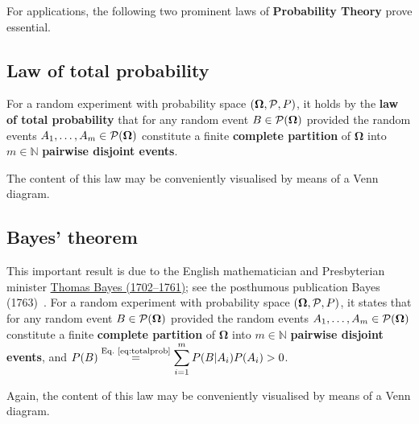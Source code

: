 \medskip
\noindent
For applications, the following two prominent laws of
\textbf{Probability Theory} prove essential.

\subsection[Law of total probability]{Law of total probability}
For a random experiment with probability space 
$\left(\boldsymbol{\Omega}, {\cal P}, P\right)$, it holds by the 
\textbf{law of total probability} that for any random event $B \in 
{\cal P}(\boldsymbol{\Omega})$
%
\be
{}
\ee
%
provided the random events $A_{1}, \ldots, A_{m} \in 
{\cal P}(\boldsymbol{\Omega})$ constitute a finite \textbf{complete 
partition} of $\boldsymbol{\Omega}$ into $m \in \mathbb{N}$
\textbf{pairwise disjoint events}.

\medskip
\noindent
The content of this law may be conveniently visualised by means of 
a Venn diagram.

\subsection[Bayes' theorem]{Bayes' theorem}
This important result is due to the English mathematician and
Presbyterian minister 
\href{http://www-history.mcs.st-and.ac.uk/Biographies/Bayes.html}{Thomas Bayes (1702--1761)}; see the posthumous publication Bayes 
(1763)~. For a random experiment with probability space
$\left(\boldsymbol{\Omega}, {\cal P}, P\right)$, it states that for
any random event $B \in {\cal P}(\boldsymbol{\Omega})$
%
\be
{}
\ee
%
provided the random events $A_{1}, \ldots, A_{m} \in 
{\cal P}(\boldsymbol{\Omega})$ constitute a finite \textbf{complete 
partition} of $\boldsymbol{\Omega}$ into $m \in \mathbb{N}$
\textbf{pairwise disjoint events}, and $\displaystyle 
P(B)\stackrel{\text{Eq.~\ref{eq:totalprob}}}{=}\sum_{i=1}^{m}
P(B|A_{i})P(A_{i})>0$.

\medskip
\noindent
Again, the content of this law may be conveniently visualised by 
means of a Venn diagram.

